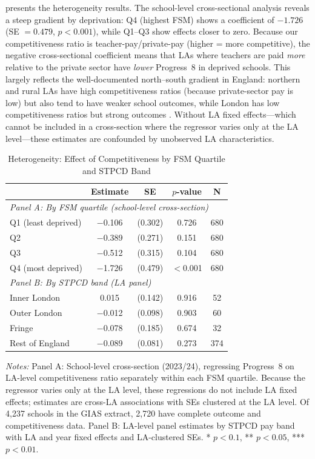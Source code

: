 \documentclass[12pt]{article}
\begin{document}
 presents the heterogeneity results. The school-level cross-sectional analysis reveals a steep gradient by deprivation: Q4 (highest FSM) shows a coefficient of $-1.726$ (SE $= 0.479$, $p < 0.001$), while Q1--Q3 show effects closer to zero. Because our competitiveness ratio is teacher-pay/private-pay (higher = more competitive), the negative cross-sectional coefficient means that LAs where teachers are paid \textit{more} relative to the private sector have \textit{lower} Progress~8 in deprived schools. This largely reflects the well-documented north--south gradient in England: northern and rural LAs have high competitiveness ratios (because private-sector pay is low) but also tend to have weaker school outcomes, while London has low competitiveness ratios but strong outcomes \citep{burgess2019teacher}. Without LA fixed effects---which cannot be included in a cross-section where the regressor varies only at the LA level---these estimates are confounded by unobserved LA characteristics.

\begin{table}[H]
\centering
\caption{Heterogeneity: Effect of Competitiveness by FSM Quartile and STPCD Band}
\label{tab:het}
\begin{threeparttable}
\begin{tabular}{lcccc}
\toprule
 & Estimate & SE & $p$-value & N \\
\midrule
\multicolumn{5}{l}{\textit{Panel A: By FSM quartile (school-level cross-section)}} \\
Q1 (least deprived) & $-$0.106 & (0.302) & 0.726 & 680 \\
Q2 & $-$0.389 & (0.271) & 0.151 & 680 \\
Q3 & $-$0.512 & (0.315) & 0.104 & 680 \\
Q4 (most deprived) & $-$1.726 & (0.479) & $<$0.001 & 680 \\
[0.5em]
\multicolumn{5}{l}{\textit{Panel B: By STPCD band (LA panel)}} \\
Inner London & 0.015 & (0.142) & 0.916 & 52 \\
Outer London & $-$0.012 & (0.098) & 0.903 & 60 \\
Fringe & $-$0.078 & (0.185) & 0.674 & 32 \\
Rest of England & $-$0.089 & (0.081) & 0.273 & 374 \\
\bottomrule
\end{tabular}
\begin{tablenotes}[flushleft]
\small
\item \textit{Notes:} Panel A: School-level cross-section (2023/24), regressing Progress~8 on LA-level competitiveness ratio separately within each FSM quartile. Because the regressor varies only at the LA level, these regressions do not include LA fixed effects; estimates are cross-LA associations with SEs clustered at the LA level. Of 4,237 schools in the GIAS extract, 2,720 have complete outcome and competitiveness data. Panel B: LA-level panel estimates by STPCD pay band with LA and year fixed effects and LA-clustered SEs. * $p<0.1$, ** $p<0.05$, *** $p<0.01$.
\end{tablenotes}
\end{threeparttable}
\end{table}
\end{document}
